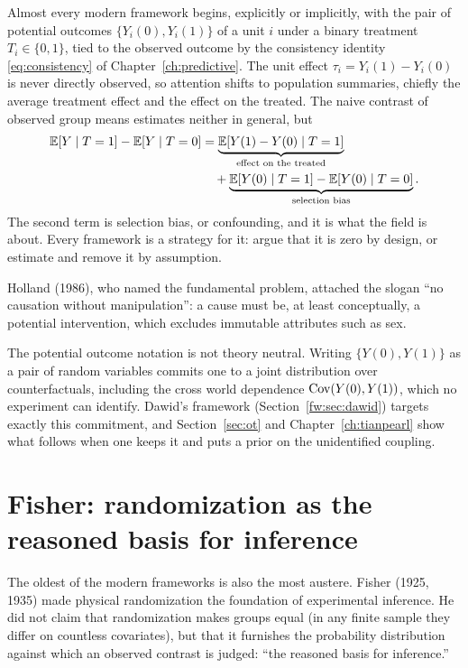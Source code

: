 Almost every modern framework begins, explicitly or implicitly, with the pair of potential outcomes $\{Y_i(0), Y_i(1)\}$ of a unit $i$ under a binary treatment $T_i \in \{0,1\}$, tied to the observed outcome by the consistency identity \eqref{eq:consistency} of Chapter~\ref{ch:predictive}. The unit effect $\tau_i = Y_i(1) - Y_i(0)$ is never directly observed, so attention shifts to population summaries, chiefly the average treatment effect and the effect on the treated. The naive contrast of observed group means estimates neither in general, but
\begin{equation}\label{fw:eq:decomp}
\begin{split}
\mathbb{E}[Y \mid T=1] - \mathbb{E}[Y \mid T=0] &= \underbrace{\mathbb{E}[Y(1)-Y(0)\mid T=1]}_{\text{effect on the treated}}\\
&\quad + \underbrace{\mathbb{E}[Y(0)\mid T=1] - \mathbb{E}[Y(0)\mid T=0]}_{\text{selection bias}}.
\end{split}
\end{equation}
The second term is selection bias, or confounding, and it is what the field is about. Every framework is a strategy for it: argue that it is zero by design, or estimate and remove it by assumption.

Holland (1986), who named the fundamental problem, attached the slogan ``no causation without manipulation'': a cause must be, at least conceptually, a potential intervention, which excludes immutable attributes such as sex.

The potential outcome notation is not theory neutral. Writing $\{Y(0), Y(1)\}$ as a pair of random variables commits one to a joint distribution over counterfactuals, including the cross world dependence $\mathrm{Cov}(Y(0), Y(1))$, which no experiment can identify. Dawid's framework (Section~\ref{fw:sec:dawid}) targets exactly this commitment, and Section~\ref{sec:ot} and Chapter~\ref{ch:tianpearl} show what follows when one keeps it and puts a prior on the unidentified coupling.

\section{Fisher: randomization as the reasoned basis for inference}\label{fw:sec:fisher}

The oldest of the modern frameworks is also the most austere. Fisher (1925, 1935) made physical randomization the foundation of experimental inference. He did not claim that randomization makes groups equal (in any finite sample they differ on countless covariates), but that it furnishes the probability distribution against which an observed contrast is judged: ``the reasoned basis for inference.''

